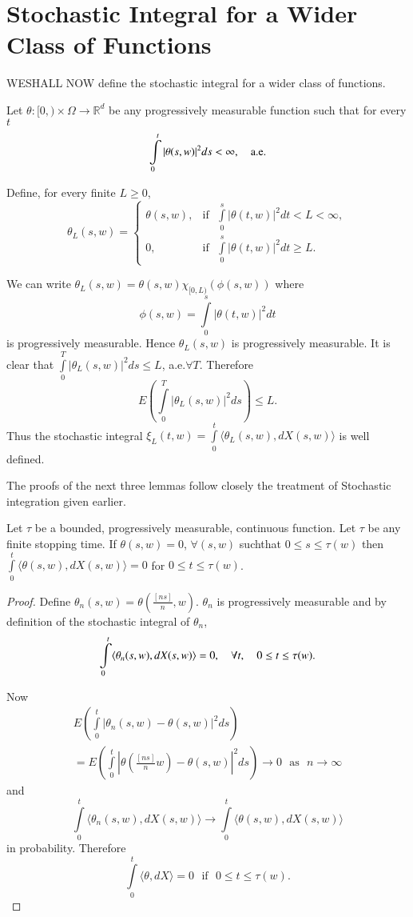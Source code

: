 \chapter{Stochastic Integral for a Wider Class of
  Functions}\label{chap23}

WE\pageoriginale SHALL NOW define the stochastic integral for a wider
class of functions.

Let $\theta:[0,)\times\Omega\to \mathbb{R}^{d}$ be any progressively
  measurable function such that for every $t$
$$
\int\limits^{t}_{0}|\theta(s,w)|^{2}ds<\infty,\quad \text{a.e.}
$$

Define, for every finite $L\geq 0$,
$$
\theta_{L}(s,w)=
\begin{cases}
\theta(s,w), & \text{if~ }
\int\limits^{s}_{0}|\theta(t,w)|^{2}dt<L<\infty,\\
0, & \text{if~ }\int\limits^{s}_{0}|\theta(t,w)|^{2}dt\geq L.
\end{cases}
$$

We can write $\theta_{L}(s,w)=\theta(s,w)\chi_{[0,L)}(\phi(s,w))$
  where 
$$
\phi(s,w)=\int\limits^{s}_{0}|\theta(t,w)|^{2}dt
$$ 
is  progressively measurable. Hence $\theta_{L}(s,w)$ is progressively
  measurable. It is clear that
  $\int\limits^{T}_{0}|\theta_{L}(s,w)|^{2}ds\leq L$, a.e.\@ $\forall
  T$. Therefore 
$$
E(\int\limits^{T}_{0}|\theta_{L}(s,w)|^{2}ds)\leq
  L.
$$ 
Thus the stochastic integral
  $\xi_{L}(t,w)=\int\limits^{t}_{0}\langle
  \theta_{L}(s,w),dX(s,w)\rangle$ is well defined.

The proofs of the next three lemmas follow closely the treatment of
Stochastic integration given earlier.

\setcounter{lemma}{0}
\begin{lemma}\label{chap23-lem1}
Let $\tau$ be a bounded, progressively measurable, continuous
function. Let $\tau$ be any finite stopping time. If $\theta(s,w)=0$,
$\forall (s,w)$ such\pageoriginale that $0\leq s\leq \tau(w)$ then
$\int\limits^{t}_{0}\langle \theta(s,w),dX(s,w)\rangle =0$ for $0\leq
t\leq \tau(w)$.
\end{lemma}

\begin{proof}
Define $\theta_{n}(s,w)=\theta(\frac{[ns]}{n},w)$. $\theta_{n}$ is
progressively measurable and by definition of the stochastic integral
of $\theta_{n}$,
$$
\int\limits^{t}_{0}\langle \theta_{n}(s,w),dX(s,w)\rangle =0,\quad
\forall t,\quad 0\leq t\leq \tau(w).
$$

Now 
\begin{gather*}
E\left(\int\limits^{t}_{0}|\theta_{n}(s,w)-\theta(s,w)|^{2}ds\right)\\
=E\left(\int\limits^{t}_{0}|\theta\left(\frac{[ns]}{n}w\right)-\theta(s,w)|^{2}ds\right)\to
0\text{~ as~ } n\to \infty
\end{gather*}
and 
$$
\int\limits^{t}_{0}\langle \theta_{n}(s,w),dX(s,w)\rangle \to
\int\limits^{t}_{0}\langle \theta(s,w),dX(s,w)\rangle
$$
in probability. Therefore
$$
\int\limits^{t}_{0}\langle \theta, dX\rangle =0\text{~ if~ } 0\leq
t\leq \tau(w).
$$
\end{proof}

